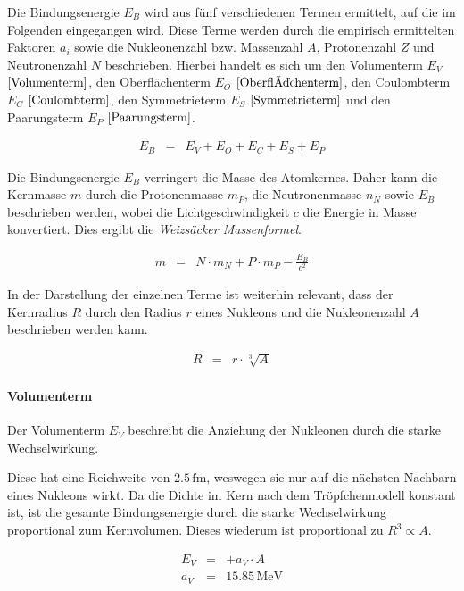\documentclass[12pt,a4paper]{scrartcl}
\numberwithin{equation}{section} %
\begin{document}
Die Bindungsenergie $E_B$ wird aus fünf verschiedenen Termen ermittelt, auf die im Folgenden eingegangen wird. Diese Terme werden durch die empirisch ermittelten Faktoren $a_i$ sowie die Nukleonenzahl bzw. Massenzahl $A$, Protonenzahl $Z$ und Neutronenzahl $N$ beschrieben. Hierbei handelt es sich um den Volumenterm $E_V$ $\eqref{Volumenterm}$, den Oberflächenterm $E_O$ $\eqref{Oberflächenterm}$, den Coulombterm $E_C$ $\eqref{Coulombterm}$, den Symmetrieterm $E_S$ $\eqref{Symmetrieterm}$ und den Paarungsterm $E_P$ $\eqref{Paarungsterm}$.

\begin{eqnarray}
	E_B &=& E_V + E_O + E_C + E_S + E_P
\end{eqnarray}

\noindent
Die Bindungsenergie $E_B$ verringert die Masse des Atomkernes. Daher kann die Kernmasse $m$ durch die Protonenmasse $m_P$, die Neutronenmasse $n_N$ sowie $E_B$ beschrieben werden, wobei die Lichtgeschwindigkeit $c$ die Energie in Masse konvertiert. Dies ergibt die \emph{Weizsäcker Massenformel}.

\begin{eqnarray}
	m &=& N\cdot m_N + P\cdot m_P - \frac{E_B}{c^2} \label{eq:Massenformel}
\end{eqnarray}

\noindent
In der Darstellung der einzelnen Terme ist weiterhin relevant, dass der Kernradius $R$ durch den Radius $r$ eines Nukleons und die Nukleonenzahl $A$ beschrieben werden kann.

\begin{eqnarray}
	R &=& r \cdot \sqrt[3]{A}
\end{eqnarray}

\hypertarget{volumenterm}{%
	\paragraph{Volumenterm}\label{volumenterm}}

Der Volumenterm $E_V$ beschreibt die Anziehung der Nukleonen durch die starke Wechselwirkung.

Diese hat eine Reichweite von $2.5\mathrm{\,fm}$, weswegen sie nur auf die nächsten Nachbarn eines Nukleons wirkt. Da die Dichte im Kern nach dem Tröpfchenmodell konstant ist, ist die gesamte Bindungsenergie durch die starke Wechselwirkung proportional zum Kernvolumen. Dieses wiederum ist proportional zu $R^3\propto A$.

\begin{eqnarray}
	E_V &=& + a_V\cdot A \label{Volumenterm} \\
	a_V &=& 15.85\mathrm{\,MeV}
\end{eqnarray}
\end{document}
